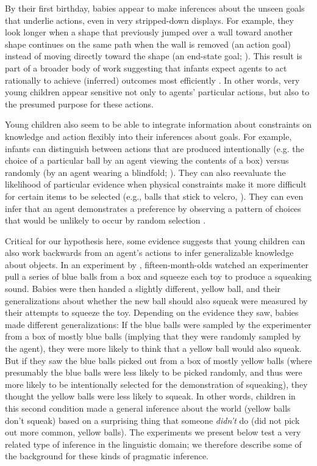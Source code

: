 \documentclass[man]{apa2}
\begin{document}

By their first birthday, babies appear to make inferences about the unseen goals that underlie actions, even in very stripped-down displays.  For example, they look longer when a shape that previously jumped over a wall toward another shape continues on the same path when the wall is removed (an action goal) instead of moving directly toward the shape (an end-state goal; ). This result is part of a broader body of work suggesting that infants expect agents to act rationally to achieve (inferred) outcomes most efficiently \cite{csibra1998, gergely2003}. In other words, very young children appear sensitive not only to agents' particular actions, but also to the presumed purpose for these actions. 

Young children also seem to be able to integrate information about constraints on knowledge and action flexibly into their inferences about goals. For example, infants can distinguish between actions that are produced intentionally (e.g. the choice of a particular ball by an agent viewing the contents of a box) versus randomly (by an agent wearing a blindfold; ).  They can also reevaluate the likelihood of particular evidence when physical constraints make it more difficult for certain items to be selected (e.g., balls that stick to velcro, ).  They can even infer that an agent demonstrates a preference by observing a pattern of choices that would be unlikely to occur by random selection \cite{kushnir2010}. 

Critical for our hypothesis here, some evidence suggests that young children can also work backwards from an agent's actions to infer generalizable knowledge about objects. In an experiment by , fifteen-month-olds watched an experimenter pull a series of blue balls from a box and squeeze each toy to produce a squeaking sound. Babies were then handed a slightly different, yellow ball, and their generalizations about whether the new ball should also squeak were measured by their attempts to squeeze the toy. Depending on the evidence they saw, babies made different generalizations: If the blue balls were sampled by the experimenter from a box of mostly blue balls (implying that they were randomly sampled by the agent), they were more likely to think that a yellow ball would also squeak. But if they saw the blue balls picked out from a box of mostly yellow balls (where presumably the blue balls were less likely to be picked randomly, and thus were more likely to be intentionally selected for the demonstration of squeaking), they thought the yellow balls were less likely to squeak. In other words, children in this second condition made a general inference about the world (yellow balls don't squeak) based on a surprising thing that someone \emph{didn't} do (did not pick out more common, yellow balls). The experiments we present below test a very related type of inference in the linguistic domain; we therefore describe some of the background for these kinds of pragmatic inference. 
\end{document}
